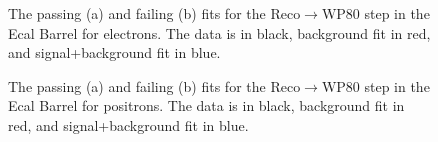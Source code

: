 \begin{thebibliography}{10}
\begin{figure}[htb]
  \begin{center}
    \caption{The passing (a) and failing (b) fits for the Reco$\to$WP80 step in the Ecal Barrel for electrons.
             The data is in black, background fit in red, and signal+background fit in blue.}
  \end{center}
\end{figure}

\begin{figure}[htb]
  \begin{center}
    \caption{The passing (a) and failing (b) fits for the Reco$\to$WP80 step in the Ecal Barrel for positrons.
             The data is in black, background fit in red, and signal+background fit in blue.}
  \end{center}
\end{figure}


\end{thebibliography}
